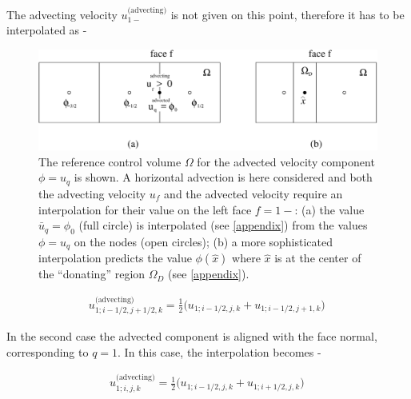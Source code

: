 The advecting velocity  $u_{1-}^{\textrm{(advecting)}}$ 
is not given on this point, therefore it has to be interpolated as - 


\begin{figure}
\begin{center}
    \includegraphics[width=\textwidth]{plots/advect-ed-ing.pdf}
\end{center}
\caption{The reference control volume $\Omega$ for the advected velocity component 
$\phi=u_q$ is shown. A horizontal advection is here considered and both the advecting velocity 
$u_f$ and the advected velocity require an interpolation for their value on the left face 
$f=1-$: (a) the value $\bar u_q = \phi_0$ (full circle) is interpolated 
(see \ref{appendix}) from the values $\phi=u_q$ on the nodes (open circles);
(b) a more sophisticated interpolation predicts the value $\phi(\hat x)$ where $\hat x$ is
at the center of the ``donating'' region $\Omega_D$ (see \ref{appendix}).}
\label{advect-ed-ing-fig}
\end{figure}




\begin{align}
 u_{1;i-1/2,j+1/2,k}^{\textrm{(advecting)}} = \frac12 \big( u_{1;i-1/2,j,k} + u_{1;i-1/2,j+1,k} 
\big) \,
\label{uf2}
\end{align}


In the second case the advected component is aligned with the 
face normal, corresponding to $q=1$. 
In this case, the interpolation becomes -  


\begin{align}
	u_{1;i,j,k}^{\textrm{(advecting)}} = \frac12 \big( u_{1;i-1/2,j,k} + u_{1;i+1/2,j,k} \big) \,
\label{uf1} 
\end{align}
 

